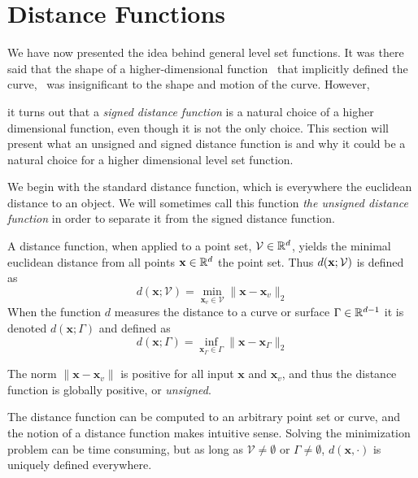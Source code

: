 \section{Distance Functions}\label{sec:distance-function}

We have now presented the idea behind general level set functions. It was there said that the shape of a higher-dimensional function \uxt\ that implicitly defined the curve, \curve\ was insignificant to the shape and motion of the curve. However, 


it turns out that a \textit{signed distance function} is a natural choice of a higher dimensional function, even though it is not the only choice. This section will present what an unsigned and signed distance function is and why it could be a natural choice for a higher dimensional level set function. 

We begin with the standard distance function, which is everywhere the euclidean distance to an object. We will sometimes call this function \textit{the unsigned distance function} in order to separate it from the signed distance function. 

\begin{definition}
\cite{2003-book} A distance function, when applied to a point set, $\mathcal{V} \in \mathbb{R}^d$, yields the minimal euclidean distance from all points $\mathbf{x} \in \mathbb{R}^d$ the point set. Thus $d(\mathbf{x}; \mathcal{V})$ is defined as 
\begin{equation}
    d(\mathbf{x};\mathcal{V}) = \min_{\mathbf{x}_{v} \in \mathcal{V}} \|\mathbf{x}-\mathbf{x}_{v} \|_2
    \label{eq:unsigned-distance-function}
\end{equation}
When the function $d$ measures the distance to a curve or surface $\Gamma \in \mathbb{R}^{d-1}$ it is denoted $d(\mathbf{x}; \Gamma)$ and defined as 
\begin{equation}
    d(\mathbf{x}; \Gamma) = \inf_{\mathbf{x}_{\Gamma}\in \Gamma} \|\mathbf{x}- \mathbf{x}_{\Gamma}\|_2
    \label{eq:unsigned-distance-function-curve}
\end{equation}
\end{definition}

The norm $\|\mathbf{x}-\mathbf{x}_{v} \|$ is positive for all input $\mathbf{x}$ and $\mathbf{x}_{v}$, and thus the distance function is globally positive, or \textit{unsigned}.

The distance function can be computed to an arbitrary point set or curve, and the notion of a distance function makes intuitive sense. Solving the minimization problem can be time consuming, but as long as $\mathcal{V}\neq \emptyset$ or $\Gamma \neq \emptyset$, $d(\mathbf{x},\cdot)$ is uniquely defined everywhere.

